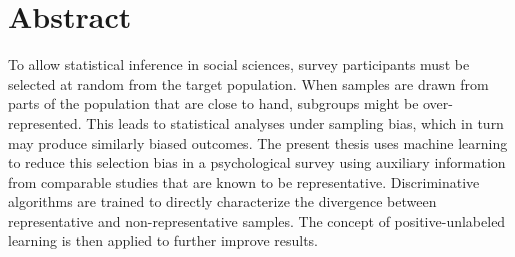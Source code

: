 \chapter*{Abstract}
\thispagestyle{empty}
To allow statistical inference in social sciences, survey participants must be selected at random from the target population. When samples are drawn from parts of the population that are close to hand, subgroups might be over-represented. This leads to statistical analyses under sampling bias, which in turn may produce similarly biased outcomes. The present thesis uses machine learning to reduce this selection bias in a psychological survey using auxiliary information from comparable studies that are known to be representative. Discriminative algorithms are trained to directly characterize the divergence between representative and non-representative samples. The concept of positive-unlabeled learning is then applied to further improve results.




